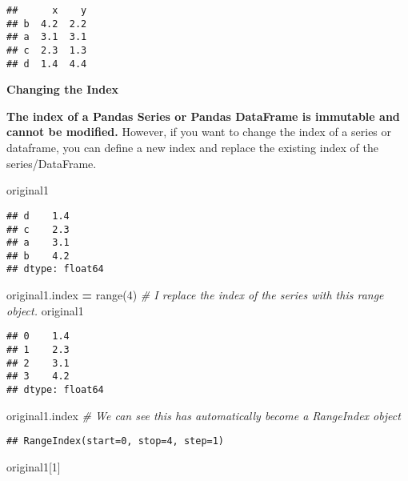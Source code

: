 \documentclass[
]{book}
\newenvironment{Shaded}{\begin{snugshade}}{\end{snugshade}}
\newcommand{\BuiltInTok}[1]{#1}
\newcommand{\CommentTok}[1]{\textcolor[rgb]{0.56,0.35,0.01}{\textit{#1}}}
\newcommand{\DecValTok}[1]{\textcolor[rgb]{0.00,0.00,0.81}{#1}}
\newcommand{\NormalTok}[1]{#1}
\newcommand{\OperatorTok}[1]{\textcolor[rgb]{0.81,0.36,0.00}{\textbf{#1}}}
\begin{document}
\begin{verbatim}
##      x    y
## b  4.2  2.2
## a  3.1  3.1
## c  2.3  1.3
## d  1.4  4.4
\end{verbatim}

\textbf{Changing the Index}

{\textbf{The index of a Pandas Series or Pandas DataFrame is immutable and cannot be modified.}} However, if you want to change the index of a series or dataframe, you can define a new index and replace the existing index of the series/DataFrame.

\begin{Shaded}
\begin{Highlighting}[]
\NormalTok{original1}
\end{Highlighting}
\end{Shaded}

\begin{verbatim}
## d    1.4
## c    2.3
## a    3.1
## b    4.2
## dtype: float64
\end{verbatim}

\begin{Shaded}
\begin{Highlighting}[]
\NormalTok{original1.index }\OperatorTok{=} \BuiltInTok{range}\NormalTok{(}\DecValTok{4}\NormalTok{) }\CommentTok{\# I replace the index of the series with this range object.}
\NormalTok{original1}
\end{Highlighting}
\end{Shaded}

\begin{verbatim}
## 0    1.4
## 1    2.3
## 2    3.1
## 3    4.2
## dtype: float64
\end{verbatim}

\begin{Shaded}
\begin{Highlighting}[]
\NormalTok{original1.index }\CommentTok{\# We can see this has automatically become a RangeIndex object}
\end{Highlighting}
\end{Shaded}

\begin{verbatim}
## RangeIndex(start=0, stop=4, step=1)
\end{verbatim}

\begin{Shaded}
\begin{Highlighting}[]
\NormalTok{original1[}\DecValTok{1}\NormalTok{]}
\end{Highlighting}
\end{Shaded}
\end{document}
